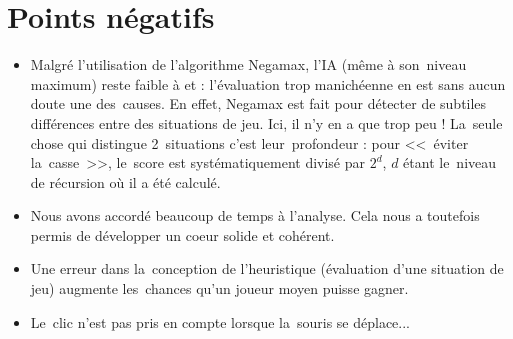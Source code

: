 \section{Points négatifs}
\begin{itemize}

	\item Malgré l'utilisation de l'algorithme Negamax, l'IA (même à son~niveau maximum) reste faible à \ttt{} et \cf{} : 
            l'évaluation trop manichéenne en est sans aucun doute une des~causes. En effet, Negamax est fait pour 
            détecter de subtiles différences entre des situations de jeu. Ici, il n'y en a que trop peu ! 
            La~seule chose qui distingue 2~situations c'est leur~profondeur : pour <<~éviter la~casse~>>, 
            le~score est systématiquement divisé par $2^d$, $d$ étant le~niveau de récursion où il a été calculé. 
            
    \item Nous avons accordé beaucoup de temps à l'analyse. 
            Cela nous a toutefois permis de développer un coeur solide et cohérent.
    
    \item Une erreur dans la~conception de l'heuristique (évaluation d'une situation de jeu) 
            augmente les~chances qu'un joueur moyen puisse gagner.
    
    \item Le~clic n'est pas pris en compte lorsque la~souris se déplace...
    
\end{itemize}